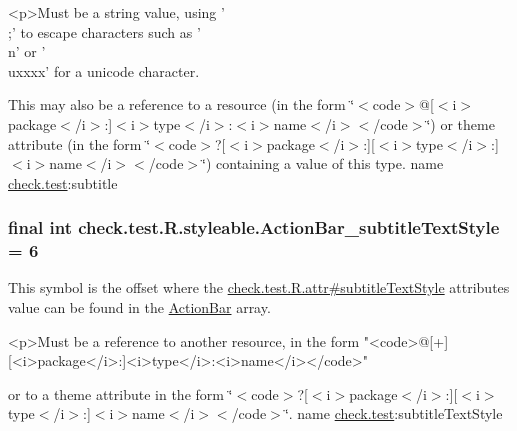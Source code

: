\begin{DoxyVerb}      <p>Must be a string value, using '\\;' to escape characters such as '\\n' or '\\uxxxx' for a unicode character.
\end{DoxyVerb}
 

This may also be a reference to a resource (in the form \char`\"{}$<$code$>$@\mbox{[}$<$i$>$package$<$/i$>$\+:\mbox{]}$<$i$>$type$<$/i$>$\+:$<$i$>$name$<$/i$>$$<$/code$>$\char`\"{}) or theme attribute (in the form \char`\"{}$<$code$>$?\mbox{[}$<$i$>$package$<$/i$>$\+:\mbox{]}\mbox{[}$<$i$>$type$<$/i$>$\+:\mbox{]}$<$i$>$name$<$/i$>$$<$/code$>$\char`\"{}) containing a value of this type.  name \hyperlink{namespacecheck_1_1test}{check.\+test}\+:subtitle \hypertarget{classcheck_1_1test_1_1_r_1_1styleable_ad8f744ed2471b251e30b55ec1193a048}{}
\subsubsection[{Action\+Bar\+\_\+subtitle\+Text\+Style}]{\setlength{\rightskip}{0pt plus 5cm}final int check.\+test.\+R.\+styleable.\+Action\+Bar\+\_\+subtitle\+Text\+Style = 6\hspace{0.3cm}{\ttfamily [static]}}\label{classcheck_1_1test_1_1_r_1_1styleable_ad8f744ed2471b251e30b55ec1193a048}
This symbol is the offset where the \hyperlink{classcheck_1_1test_1_1_r_1_1attr_a9cca12a24b4e55c67ec8573d8aca9d25}{check.\+test.\+R.\+attr\#subtitle\+Text\+Style} attribute\textquotesingle{}s value can be found in the \hyperlink{classcheck_1_1test_1_1_r_1_1styleable_ad0a4d403cb244ea4d22c6f6ebf2c2cdf}{Action\+Bar} array.

\begin{DoxyVerb}      <p>Must be a reference to another resource, in the form "<code>@[+][<i>package</i>:]<i>type</i>:<i>name</i></code>"
\end{DoxyVerb}
 or to a theme attribute in the form \char`\"{}$<$code$>$?\mbox{[}$<$i$>$package$<$/i$>$\+:\mbox{]}\mbox{[}$<$i$>$type$<$/i$>$\+:\mbox{]}$<$i$>$name$<$/i$>$$<$/code$>$\char`\"{}.  name \hyperlink{namespacecheck_1_1test}{check.\+test}\+:subtitle\+Text\+Style \hypertarget{classcheck_1_1test_1_1_r_1_1styleable_a9f68b2ef978d31096a2c231b92d807bc}{}
